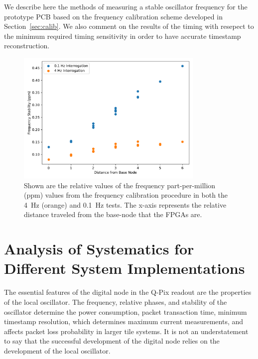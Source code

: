 We describe here the methods of measuring a stable oscillator frequency for the prototype PCB based on the frequency calibration scheme developed in Section~\ref{sec:calib}.
We also comment on the results of the timing with resepect to the minimum required timing sensitivity in order to have accurate timestamp reconstruction.

\begin{figure}[]
\centering
\includegraphics[width=0.8\textwidth]{images/interrogation_ppm_diff.pdf}
\caption{Shown are the relative values of the frequency part-per-million (ppm) values from the frequency calibration procedure in both the 4~\unit{Hz} (orange) and 0.1~\unit{Hz} tests.
The x-axis represents the relative distance traveled from the base-node that the FPGAs are.
}
\end{figure}



\section{Analysis of Systematics for Different System Implementations}

The essential features of the digital node in the Q-Pix readout are the properties of the local oscillator.
The frequency, relative phases, and stability of the oscillator determine the power consumption, packet transaction time, minimum timestamp resolution, which determines maximum current measurements, and affects packet loss probability in larger tile systems.
It is not an understatement to say that the successful development of the digital node relies on the development of the local oscillator.

